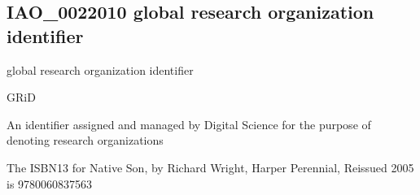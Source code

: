 \documentclass[letterpaper,10pt,english]{sphinxmanual}
\begin{document}
\subsection{IAO\_0022010 \sphinxhyphen{} global research organization identifier}
\label{\detokenize{doc-IAO_0022010:iao-0022010-global-research-organization-identifier}}\label{\detokenize{doc-IAO_0022010:index-0}}\label{\detokenize{doc-IAO_0022010::doc}}
\begin{sphinxShadowBox}

\sphinxAtStartPar
global research organization identifier
\end{sphinxShadowBox}

\begin{sphinxShadowBox}

\sphinxAtStartPar
{}

\sphinxAtStartPar
GRiD
\end{sphinxShadowBox}

\begin{sphinxShadowBox}

\sphinxAtStartPar
{\hyperref[\detokenize{doc-IAO_0000578::doc}]{}}
\end{sphinxShadowBox}

\begin{sphinxShadowBox}

\sphinxAtStartPar
An identifier assigned and managed by Digital Science for the purpose of denoting research organizations
\end{sphinxShadowBox}

\begin{sphinxShadowBox}

\sphinxAtStartPar
{}
\end{sphinxShadowBox}

\begin{sphinxShadowBox}

\sphinxAtStartPar
The ISBN\sphinxhyphen{}13 for Native Son, by Richard Wright, Harper Perennial, Reissued 2005 is 978\sphinxhyphen{}0\sphinxhyphen{}06\sphinxhyphen{}083756\sphinxhyphen{}3
\end{sphinxShadowBox}

\begin{sphinxShadowBox}

\sphinxAtStartPar
{}
\end{sphinxShadowBox}
\end{document}
